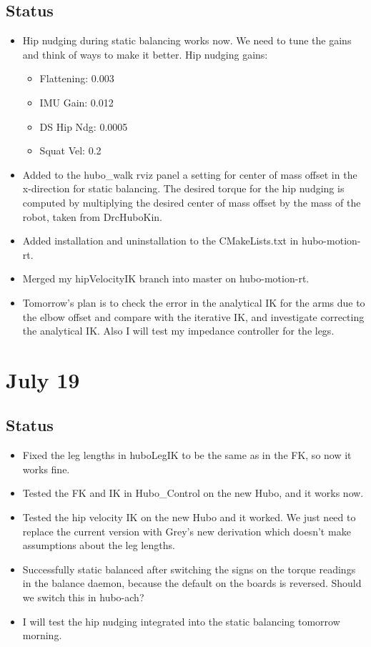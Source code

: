 \documentclass[letterpaper, 10 pt]{report}
\begin{document}
\subsection*{Status}
\begin{itemize}
\item Hip nudging during static balancing works now. We need to tune the gains and think of ways to make it better.
\newline Hip nudging gains:
\begin{itemize}
\item Flattening: 0.003
\item IMU Gain: 0.012
\item DS Hip Ndg: 0.0005
\item Squat Vel: 0.2
\end{itemize}
\item Added to the hubo\_walk rviz panel a setting for center of mass offset in the x-direction for static balancing. The desired torque for the hip nudging is computed by multiplying the desired center of mass offset by the mass of the robot, taken from DrcHuboKin.
\item Added installation and uninstallation to the CMakeLists.txt in hubo-motion-rt.
\item Merged my hipVelocityIK branch into master on hubo-motion-rt.
\item Tomorrow's plan is to check the error in the analytical IK for the arms due to the elbow offset and compare with the iterative IK, and investigate correcting the analytical IK. Also I will test my impedance controller for the legs.
\end{itemize}

\section*{July 19}
\subsection*{Status}
\begin{itemize}
\item Fixed the leg lengths in huboLegIK to be the same as in the FK, so now it works fine.
\item Tested the FK and IK in Hubo\_Control on the new Hubo, and it works now.
\item Tested the hip velocity IK on the new Hubo and it worked. We just need to replace the current version with Grey's new derivation which doesn't make assumptions about the leg lengths.
\item Successfully static balanced after switching the signs on the torque readings in the balance daemon, because the default on the boards is reversed.
\newline Should we switch this in hubo-ach?
\item I will test the hip nudging integrated into the static balancing tomorrow morning.
\end{itemize}
\end{document}
